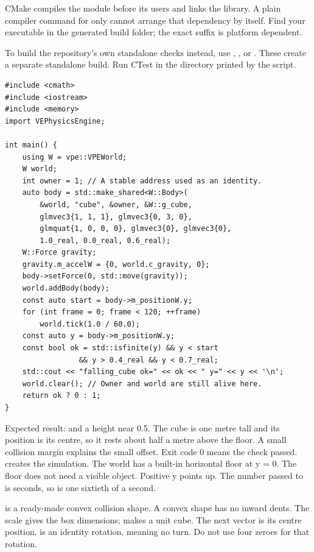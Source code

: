 \documentclass[11pt,a4paper]{article}
\begin{document}
CMake compiles the module before its users and links the library. A plain compiler command for only  cannot arrange that dependency by itself. Find your  executable in the generated build folder; the exact suffix is platform dependent.

To build the repository's own standalone checks instead, use , , or . These create a separate standalone build. Run CTest in the directory printed by the script.
\begin{lstlisting}
#include <cmath>
#include <iostream>
#include <memory>
import VEPhysicsEngine;

int main() {
    using W = vpe::VPEWorld;
    W world;
    int owner = 1; // A stable address used as an identity.
    auto body = std::make_shared<W::Body>(
        &world, "cube", &owner, &W::g_cube,
        glmvec3{1, 1, 1}, glmvec3{0, 3, 0},
        glmquat{1, 0, 0, 0}, glmvec3{0}, glmvec3{0},
        1.0_real, 0.0_real, 0.6_real);
    W::Force gravity;
    gravity.m_accelW = {0, world.c_gravity, 0};
    body->setForce(0, std::move(gravity));
    world.addBody(body);
    const auto start = body->m_positionW.y;
    for (int frame = 0; frame < 120; ++frame)
        world.tick(1.0 / 60.0);
    const auto y = body->m_positionW.y;
    const bool ok = std::isfinite(y) && y < start
                 && y > 0.4_real && y < 0.7_real;
    std::cout << "falling_cube ok=" << ok << " y=" << y << '\n';
    world.clear(); // Owner and world are still alive here.
    return ok ? 0 : 1;
}
\end{lstlisting}
Expected result:  and a height near 0.5. The cube is one metre tall and its position is its centre, so it rests about half a metre above the floor. A small collision margin explains the small offset. Exit code 0 means the check passed.
 creates the simulation. The world has a built-in horizontal floor at y = 0. The floor does not need a visible object. Positive y points up. The number passed to  is seconds, so  is one sixtieth of a second.

 is a ready-made convex collision shape. A convex shape has no inward dents. The scale gives the box dimensions;  makes a unit cube. The next vector is its centre position.  is an identity rotation, meaning no turn. Do not use four zeroes for that rotation.
\end{document}
